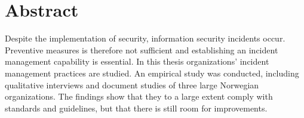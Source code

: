 \chapter*{Abstract}
Despite the implementation of security, information security incidents occur. Preventive measures is therefore not sufficient and establishing an incident management capability is essential. In this thesis organizations' incident management practices are studied. An empirical study was conducted, including qualitative interviews and document studies of three large Norwegian organizations. The findings show that they to a large extent comply with standards and guidelines, but that there is still room for improvements. 